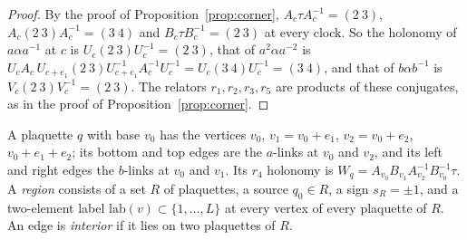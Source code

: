 \documentclass[11pt,a4paper]{article}
\theoremstyle{plain}
\theoremstyle{definition}
\theoremstyle{remark}
\begin{document}
\begin{proof}
By the proof of Proposition~\ref{prop:corner}, $A_c\tau A_c^{-1}=(2\ 3)$, $A_c(2\ 3)A_c^{-1}=(3\ 4)$ and $B_c\tau B_c^{-1}=(2\ 3)$ at every
clock. So the holonomy of $a\alpha a^{-1}$ at $c$ is $U_c(2\ 3)U_c^{-1}=(2\ 3)$, that of $a^2\alpha a^{-2}$ is
$U_cA_c\,U_{c+e_1}(2\ 3)U_{c+e_1}^{-1}A_c^{-1}U_c^{-1}=U_c(3\ 4)U_c^{-1}=(3\ 4)$, and that of $b\alpha b^{-1}$ is $V_c(2\ 3)V_c^{-1}=(2\ 3)$.
The relators $r_1,r_2,r_3,r_5$ are products of these conjugates, as in the proof of Proposition~\ref{prop:corner}.
\end{proof}

A plaquette $q$ with base $v_0$ has the vertices $v_0$, $v_1=v_0+e_1$, $v_2=v_0+e_2$, $v_0+e_1+e_2$; its bottom and top edges are the
$a$-links at $v_0$ and $v_2$, and its left and right edges the $b$-links at $v_0$ and $v_1$. Its $r_4$ holonomy is
$W_q=A_{v_0}B_{v_1}A_{v_2}^{-1}B_{v_0}^{-1}\tau$. A \emph{region} consists of a set $R$ of plaquettes, a source $q_0\in R$, a sign
$s_R=\pm1$, and a two-element label $\mathrm{lab}(v)\subset\{1,\dots,L\}$ at every vertex of every plaquette of $R$. An edge is
\emph{interior} if it lies on two plaquettes of $R$.
\end{document}
